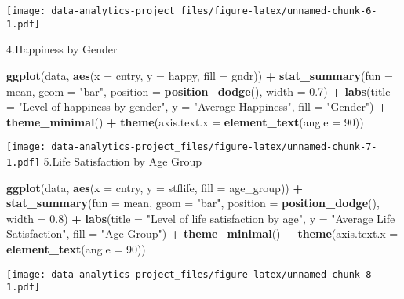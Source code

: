 \documentclass[
]{article}
\newenvironment{Shaded}{\begin{snugshade}}{\end{snugshade}}
\newcommand{\AttributeTok}[1]{\textcolor[rgb]{0.13,0.29,0.53}{#1}}
\newcommand{\DecValTok}[1]{\textcolor[rgb]{0.00,0.00,0.81}{#1}}
\newcommand{\FloatTok}[1]{\textcolor[rgb]{0.00,0.00,0.81}{#1}}
\newcommand{\FunctionTok}[1]{\textcolor[rgb]{0.13,0.29,0.53}{\textbf{#1}}}
\newcommand{\NormalTok}[1]{#1}
\newcommand{\SpecialCharTok}[1]{\textcolor[rgb]{0.81,0.36,0.00}{\textbf{#1}}}
\newcommand{\StringTok}[1]{\textcolor[rgb]{0.31,0.60,0.02}{#1}}
\begin{document}
\texttt{[image: data-analytics-project\_files/figure-latex/unnamed-chunk-6-1.pdf]}

4.Happiness by Gender

\begin{Shaded}
\begin{Highlighting}[]
\FunctionTok{ggplot}\NormalTok{(data, }\FunctionTok{aes}\NormalTok{(}\AttributeTok{x =}\NormalTok{ cntry, }\AttributeTok{y =}\NormalTok{ happy, }\AttributeTok{fill =}\NormalTok{ gndr)) }\SpecialCharTok{+}
  \FunctionTok{stat\_summary}\NormalTok{(}\AttributeTok{fun =}\NormalTok{ mean, }\AttributeTok{geom =} \StringTok{"bar"}\NormalTok{, }\AttributeTok{position =} \FunctionTok{position\_dodge}\NormalTok{(), }\AttributeTok{width =} \FloatTok{0.7}\NormalTok{) }\SpecialCharTok{+}
  \FunctionTok{labs}\NormalTok{(}\AttributeTok{title =} \StringTok{"Level of happiness by gender"}\NormalTok{, }\AttributeTok{y =} \StringTok{"Average Happiness"}\NormalTok{, }\AttributeTok{fill =} \StringTok{"Gender"}\NormalTok{) }\SpecialCharTok{+}
  \FunctionTok{theme\_minimal}\NormalTok{() }\SpecialCharTok{+}
  \FunctionTok{theme}\NormalTok{(}\AttributeTok{axis.text.x =} \FunctionTok{element\_text}\NormalTok{(}\AttributeTok{angle =} \DecValTok{90}\NormalTok{))}
\end{Highlighting}
\end{Shaded}

\texttt{[image: data-analytics-project\_files/figure-latex/unnamed-chunk-7-1.pdf]}
5.Life Satisfaction by Age Group

\begin{Shaded}
\begin{Highlighting}[]
\FunctionTok{ggplot}\NormalTok{(data, }\FunctionTok{aes}\NormalTok{(}\AttributeTok{x =}\NormalTok{ cntry, }\AttributeTok{y =}\NormalTok{ stflife, }\AttributeTok{fill =}\NormalTok{ age\_group)) }\SpecialCharTok{+}
  \FunctionTok{stat\_summary}\NormalTok{(}\AttributeTok{fun =}\NormalTok{ mean, }\AttributeTok{geom =} \StringTok{"bar"}\NormalTok{, }\AttributeTok{position =} \FunctionTok{position\_dodge}\NormalTok{(), }\AttributeTok{width =} \FloatTok{0.8}\NormalTok{) }\SpecialCharTok{+}
  \FunctionTok{labs}\NormalTok{(}\AttributeTok{title =} \StringTok{"Level of life satisfaction by age"}\NormalTok{, }\AttributeTok{y =} \StringTok{"Average Life Satisfaction"}\NormalTok{, }\AttributeTok{fill =} \StringTok{"Age Group"}\NormalTok{) }\SpecialCharTok{+}
  \FunctionTok{theme\_minimal}\NormalTok{() }\SpecialCharTok{+}
  \FunctionTok{theme}\NormalTok{(}\AttributeTok{axis.text.x =} \FunctionTok{element\_text}\NormalTok{(}\AttributeTok{angle =} \DecValTok{90}\NormalTok{))}
\end{Highlighting}
\end{Shaded}

\texttt{[image: data-analytics-project\_files/figure-latex/unnamed-chunk-8-1.pdf]}
\end{document}
